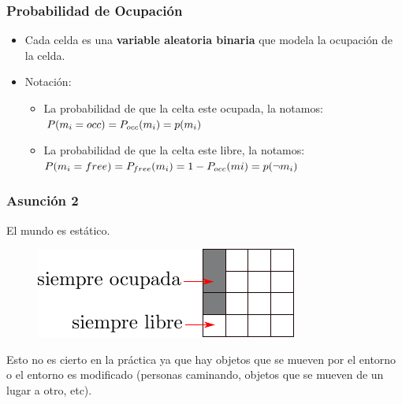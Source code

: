 \begin{frame}
    \frametitle{Probabilidad de Ocupación}
   	\begin{itemize}
    	\item Cada celda es una {\bf variable aleatoria binaria} que modela la ocupación de la celda.
    	\item Notación:
   	   	\begin{itemize}
    		\item La probabilidad de que la celta este ocupada, la notamos:\\ $P(m_{i} = occ) = P_{occ}(m_{i}) = p(m_{i})$
    		\item La probabilidad de que la celta este libre, la notamos:\\ $P(m_{i} = free) = P_{free}(m_{i}) = 1 - P_{occ}(m{i}) = p(\neg m_{i})$
    	\end{itemize}
    \end{itemize}
    
\end{frame}

\begin{frame}
    \frametitle{Asunción 2}
    El mundo es estático.
    
     	\begin{figure}[!h]
    	\includegraphics[width=0.7\columnwidth]{./images/grid_map_static_assumption.pdf}
    \end{figure}
    
    Esto no es cierto en la práctica ya que hay objetos que se mueven por el entorno o el entorno es modificado (personas caminando, objetos que se mueven de un lugar a otro, etc).
    
\end{frame}

